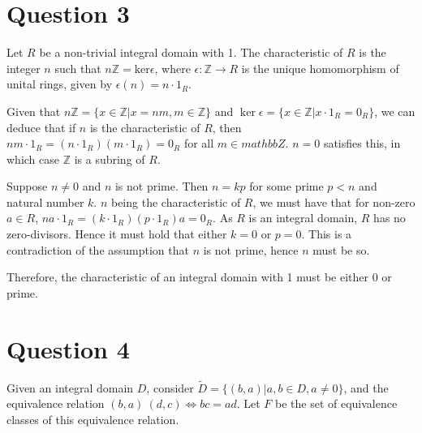\documentclass{article}
\begin{document}
\section*{Question 3}

Let $R$ be a non-trivial integral domain with 1. The characteristic of $R$
is the integer $n$ such that $n\mathbb{Z} = \text{ker}\epsilon$, where
$\epsilon: \mathbb{Z} \to R$ is the unique homomorphism of unital rings, given
by $\epsilon(n) = n\cdot1_R$.

\hfill\break
Given that $n\mathbb{Z} = \{x \in \mathbb{Z} | x = nm, m \in \mathbb{Z}\}$ and
$\ker\epsilon = \{x \in \mathbb{Z} | x\cdot1_R = 0_R\}$, we can deduce that
if $n$ is the characteristic of $R$, then $nm\cdot1_R = (n\cdot1_R)(m\cdot1_R) = 0_R$
for all $m \in mathbb{Z}$. $n = 0$ satisfies this, in which case $\mathbb{Z}$ is a
subring of $R$.

\hfill\break
Suppose $n \neq 0$ and $n$ is not prime. Then $n = kp$ for some prime $p < n$ and
natural number $k$. $n$ being the characteristic of $R$, we must have that for
non-zero $a \in R$, $na\cdot1_R = (k\cdot1_R)(p\cdot1_R)a = 0_R$. As $R$ is an
integral domain, $R$ has no zero-divisors. Hence it must hold that either $k = 0$
or $p = 0$. This is a contradiction of the assumption that $n$ is not prime, hence
$n$ must be so.

\hfill\break
Therefore, the characteristic of an integral domain with 1 must be either 0 or prime.

\section*{Question 4}

Given an integral domain $D$, consider
$\widetilde{D} = \{(b, a) | a, b \in D, a \neq 0\}$, and the equivalence
relation $(b, a) ~ (d, c) \iff bc = ad$. Let $F$ be the set of equivalence
classes of this equivalence relation.
\end{document}
